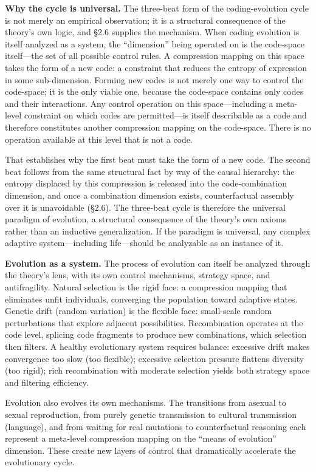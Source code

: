 \documentclass[11pt,a4paper]{article}
\begin{document}
\textbf{Why the cycle is universal.} The three-beat form of the coding-evolution cycle is not merely an empirical observation; it is a structural consequence of the theory's own logic, and \S2.6 supplies the mechanism. When coding evolution is itself analyzed as a system, the ``dimension'' being operated on is the code-space itself---the set of all possible control rules. A compression mapping on this space takes the form of a new code: a constraint that reduces the entropy of expression in some sub-dimension. Forming new codes is not merely one way to control the code-space; it is the only viable one, because the code-space contains only codes and their interactions. Any control operation on this space---including a meta-level constraint on which codes are permitted---is itself describable as a code and therefore constitutes another compression mapping on the code-space. There is no operation available at this level that is not a code.

That establishes why the first beat must take the form of a new code. The second beat follows from the same structural fact by way of the causal hierarchy: the entropy displaced by this compression is released into the code-combination dimension, and once a combination dimension exists, counterfactual assembly over it is unavoidable (\S2.6). The three-beat cycle is therefore the universal paradigm of evolution, a structural consequence of the theory's own axioms rather than an inductive generalization. If the paradigm is universal, any complex adaptive system---including life---should be analyzable as an instance of it.

\textbf{Evolution as a system.} The process of evolution can itself be analyzed through the theory's lens, with its own control mechanisms, strategy space, and antifragility. Natural selection is the rigid face: a compression mapping that eliminates unfit individuals, converging the population toward adaptive states. Genetic drift (random variation) is the flexible face: small-scale random perturbations that explore adjacent possibilities. Recombination operates at the code level, splicing code fragments to produce new combinations, which selection then filters. A healthy evolutionary system requires balance: excessive drift makes convergence too slow (too flexible); excessive selection pressure flattens diversity (too rigid); rich recombination with moderate selection yields both strategy space and filtering efficiency.

Evolution also evolves its own mechanisms. The transitions from asexual to sexual reproduction, from purely genetic transmission to cultural transmission (language), and from waiting for real mutations to counterfactual reasoning each represent a meta-level compression mapping on the ``means of evolution'' dimension. These create new layers of control that dramatically accelerate the evolutionary cycle.
\end{document}

